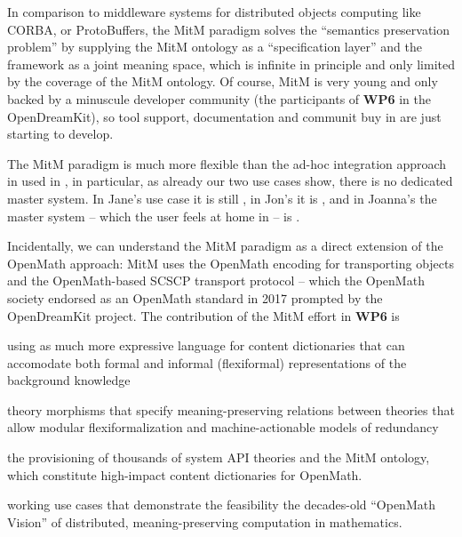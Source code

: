 In comparison to middleware systems for distributed objects computing like CORBA, or ProtoBuffers, the MitM paradigm solves the ``semantics preservation problem'' by supplying the MitM ontology as a ``specification layer'' and the \ommt framework as a joint meaning space, which is infinite in principle and only limited by the coverage of the MitM ontology. 
Of course, MitM is very young and only backed by a minuscule developer community (the participants of \textbf{WP6} in the OpenDreamKit), so tool support, documentation and communit buy in are just starting to develop. 

The MitM paradigm is much more flexible than the ad-hoc integration approach in used in \Sage, in particular, as already our two use cases show, there is no dedicated master system. In Jane's use case it is still \Sage, in Jon's it is \GAP, and in Joanna's the master system -- which the user feels at home in -- is \LMFDB.

Incidentally, we can understand the MitM paradigm as a direct extension of the OpenMath approach: MitM uses the OpenMath encoding for transporting objects and the OpenMath-based SCSCP transport protocol -- which the OpenMath society endorsed as an OpenMath standard in 2017 prompted by the OpenDreamKit project.
The contribution of the MitM effort in \textbf{WP6} is
\begin{compactenum}
  \item using \ommt as much more expressive language for content dictionaries that can accomodate both formal and informal (flexiformal) representations of the background knowledge
  \item \ommt theory morphisms that specify meaning-preserving relations between theories that allow modular flexiformalization and machine-actionable models of redundancy
  \item the provisioning of thousands of system API theories and the MitM ontology, which constitute high-impact content dictionaries for OpenMath. 
  \item working use cases that demonstrate the feasibility the decades-old ``OpenMath Vision'' of distributed, meaning-preserving computation in mathematics. 
\end{compactenum}

